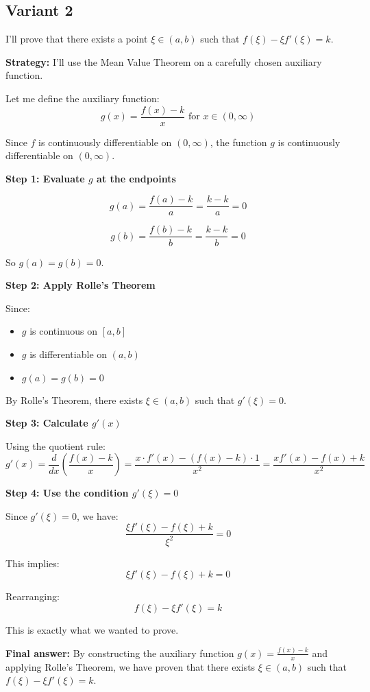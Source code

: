 \documentclass[12pt,a4paper]{article}
\theoremstyle{definition}
\begin{document}
\subsection{Variant 2}
    I'll prove that there exists a point $\xi \in (a,b)$ such that $f(\xi) - \xi f'(\xi) = k$.

    \textbf{Strategy:} I'll use the Mean Value Theorem on a carefully chosen auxiliary function.

    Let me define the auxiliary function:
    $$g(x) = \frac{f(x) - k}{x} \text{ for } x \in (0, \infty)$$

    Since $f$ is continuously differentiable on $(0,\infty)$, the function $g$ is continuously differentiable on $(0,\infty)$.

    \textbf{Step 1: Evaluate $g$ at the endpoints}

    $$g(a) = \frac{f(a) - k}{a} = \frac{k - k}{a} = 0$$

    $$g(b) = \frac{f(b) - k}{b} = \frac{k - k}{b} = 0$$

    So $g(a) = g(b) = 0$.

    \textbf{Step 2: Apply Rolle's Theorem}

    Since:
    \begin{itemize}
        \item $g$ is continuous on $[a,b]$
        \item $g$ is differentiable on $(a,b)$
        \item $g(a) = g(b) = 0$
    \end{itemize}

    By Rolle's Theorem, there exists $\xi \in (a,b)$ such that $g'(\xi) = 0$.

    \textbf{Step 3: Calculate $g'(x)$}

    Using the quotient rule:
    $$g'(x) = \frac{d}{dx}\left(\frac{f(x) - k}{x}\right) = \frac{x \cdot f'(x) - (f(x) - k) \cdot 1}{x^2} = \frac{xf'(x) - f(x) + k}{x^2}$$

    \textbf{Step 4: Use the condition $g'(\xi) = 0$}

    Since $g'(\xi) = 0$, we have:
    $$\frac{\xi f'(\xi) - f(\xi) + k}{\xi^2} = 0$$

    This implies:
    $$\xi f'(\xi) - f(\xi) + k = 0$$

    Rearranging:
    $$f(\xi) - \xi f'(\xi) = k$$

    This is exactly what we wanted to prove.

    \textbf{Final answer:} By constructing the auxiliary function $g(x) = \frac{f(x) - k}{x}$ and applying Rolle's Theorem, we have proven that there exists $\xi \in (a,b)$ such that $f(\xi) - \xi f'(\xi) = k$.
\end{document}

